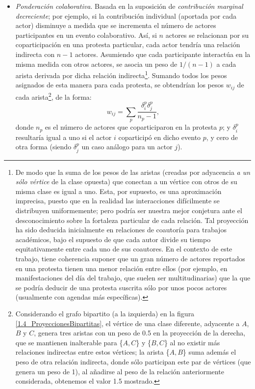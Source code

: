 \documentclass[letterpaper, 11pt]{book}
\theoremstyle{definition}
\theoremstyle{remark}
\begin{document}
\begin{itemize}
    \item \emph{Ponderación colaborativa}. Basada en la suposición de \emph{contribución marginal decreciente}; por ejemplo, si la contribución individual (aportada por cada actor) disminuye a medida que se incrementa el número de actores participantes en un evento colaborativo. 
    Así, si $n$ actores se relacionan por su coparticipación en una protesta particular, cada actor tendría una relación indirecta con $n-1$ actores. 
    Asumiendo que cada participante interactúa en la misma medida con otros actores, se asocia un peso de $1/(n-1)$ a cada arista derivada por dicha relación indirecta\footnote{
	De modo que la suma de los pesos de las aristas (creadas por adyacencia \emph{a un sólo vértice} de la clase opuesta) que conectan a un vértice con otros de su misma clase es igual a uno. 
	Esta, por supuesto, es una aproximación imprecisa, puesto que en la realidad las interacciones difícilmente se distribuyen uniformemente; pero podría ser nuestra mejor conjetura ante el desconocimiento sobre la fortaleza particular de cada relación. 
	Tal proyección ha sido deducida inicialmente en relaciones de coautoría para trabajos académicos, bajo el supuesto de que cada autor divide su tiempo equitativamente entre cada uno de sus coautores. 
	En el contexto de este trabajo, tiene coherencia suponer que un gran número de actores reportados en una protesta tienen una menor relación entre ellos (por ejemplo, en manifestaciones del día del trabajo, que suelen ser multitudinarias) que la que se podría deducir de una protesta suscrita sólo por unos pocos actores (usualmente con agendas más específicas).
    }. 
    Sumando todos los pesos asignados de esta manera para cada protesta, se obtendrían los pesos $w_{ij}$ de cada arista\footnote{
	Considerando el grafo bipartito (a la izquierda) en la figura \ref{1.4_ProyeccionesBipartitas}, el vértice de una clase diferente, adyacente a $A$, $B$ y $C$, genera tres aristas con un peso de 0.5 en la proyección de la derecha, que se mantienen inalterable para \{$A,C$\} y \{$B,C$\} al no existir más relaciones indirectas entre estos vértices; la arista \{$A,B$\} suma además el peso de otra relación indirecta, donde sólo participan este par de vértices (que genera un peso de 1), al añadirse al peso de la relación anteriormente considerada, obtenemos el valor 1.5 mostrado.
    }, de la forma: 
    \begin{equation}\label{eq:proyeccionNewman}
	w_{ij} = \sum_{p}\frac{\delta_{i}^{p} \delta_{j}^{p}}{n_{p}-1},
    \end{equation} 
    donde $n_{p}$ es el número de actores que coparticiparon en la protesta $p$; y $\delta_{i}^{p}$ resultaría igual a uno si el actor $i$ coparticipó en dicho evento $p$, y cero de otra forma (siendo $\delta_{j}^{p}$ un caso análogo para un actor $j$).
\end{itemize}
\end{document}
